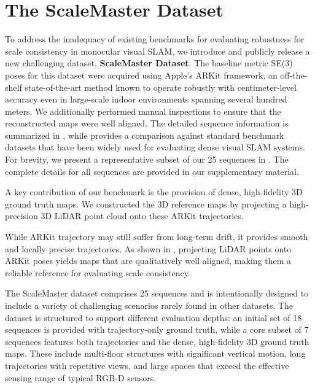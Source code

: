
\section{The ScaleMaster Dataset}
\label{sec:scalemaster_dataset}

To address the inadequacy of existing benchmarks for evaluating robustness for scale consistency in monocular visual \ac{SLAM}, we introduce and publicly release a new challenging dataset, \textbf{ScaleMaster Dataset}. The baseline metric SE(3) poses for this dataset were acquired using Apple’s ARKit framework, an off-the-shelf state-of-the-art method known to operate robustly with centimeter-level accuracy even in large-scale indoor environments spanning several hundred meters. We additionally performed manual inspections to ensure that the reconstructed maps were well aligned. The detailed sequence information is summarized in , while  provides a comparison against standard benchmark datasets that have been widely used for evaluating dense visual SLAM systems. For brevity, we present a representative subset of our 25 sequences in . The complete details for all sequences are provided in our supplementary material.

A key contribution of our benchmark is the provision of dense, high-fidelity 3D ground truth maps. We constructed the 3D reference maps by projecting a high-precision 3D LiDAR point cloud onto these ARKit trajectories.

While ARKit trajectory may still suffer from long-term drift, it provides smooth and locally precise trajectories. As shown in , projecting LiDAR points onto ARKit poses yields maps that are qualitatively well aligned, making them a reliable reference for evaluating scale consistency.

The ScaleMaster dataset comprises 25 sequences and is intentionally designed to include a variety of challenging scenarios rarely found in other datasets. The dataset is structured to support different evaluation depths: an initial set of 18 sequences is provided with trajectory-only ground truth, while a core subset of 7 sequences features both trajectories and the dense, high-fidelity 3D ground truth maps. These include multi-floor structures with significant vertical motion, long trajectories with repetitive views, and large spaces that exceed the effective sensing range of typical RGB-D sensors.

